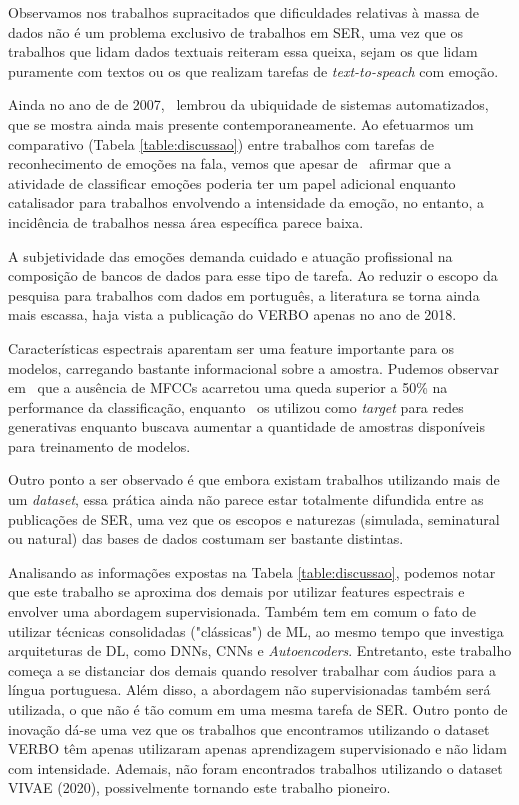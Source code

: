 Observamos nos trabalhos supracitados que dificuldades relativas à massa de dados não é um problema exclusivo de trabalhos em SER, uma vez que os trabalhos que lidam dados textuais reiteram essa queixa, sejam os que lidam puramente com textos ou os que realizam tarefas de \textit{text-to-speach} com emoção.

Ainda no ano de de 2007,~\cite{32.32} lembrou da ubiquidade de sistemas automatizados, que se mostra ainda mais presente contemporaneamente. Ao efetuarmos um comparativo (Tabela \ref{table:discussao}) entre trabalhos com tarefas de reconhecimento de emoções na fala, vemos que apesar de~\cite{14} afirmar que a atividade de classificar emoções poderia ter um papel adicional enquanto catalisador para trabalhos envolvendo a intensidade da emoção, no entanto, a incidência de trabalhos nessa área específica parece baixa.

A subjetividade das emoções demanda cuidado e atuação profissional na composição de bancos de dados para esse tipo de tarefa. Ao reduzir o escopo da pesquisa para trabalhos com dados em português, a literatura se torna ainda mais escassa, haja vista a publicação do VERBO apenas no ano de 2018.

Características espectrais aparentam ser uma feature importante para os modelos, carregando bastante informacional sobre a amostra. Pudemos observar em~\cite{11} que a ausência de \acrshort{MFCC}s acarretou uma queda superior a 50\% na performance da classificação, enquanto~\cite{34} os utilizou como \textit{target} para redes generativas enquanto buscava aumentar a quantidade de amostras disponíveis para treinamento de modelos.

Outro ponto a ser observado é que embora existam trabalhos utilizando mais de um \textit{dataset}, essa prática ainda não parece estar totalmente difundida entre as publicações de \acrshort{SER}, uma vez que os escopos e naturezas (simulada, seminatural ou natural) das bases de dados costumam ser bastante distintas.

Analisando as informações expostas na Tabela \ref{table:discussao}, podemos notar que este trabalho se aproxima dos demais por utilizar features espectrais e envolver uma abordagem supervisionada. Também tem em comum o fato de utilizar técnicas consolidadas ("clássicas") de \acrshort{ML}, ao mesmo tempo que investiga arquiteturas de \acrshort{DL}, como DNNs, \acrshort{CNNs} e \textit{Autoencoders}. Entretanto, este trabalho começa a se distanciar dos demais quando resolver trabalhar com áudios para a língua portuguesa. Além disso, a abordagem não supervisionadas também será utilizada, o que não é tão comum em uma mesma tarefa de \acrshort{SER}. Outro ponto de inovação dá-se uma vez que os trabalhos que encontramos utilizando o dataset VERBO têm apenas utilizaram apenas aprendizagem supervisionado e não lidam com intensidade. Ademais, não foram encontrados trabalhos utilizando o dataset VIVAE (2020), possivelmente tornando este trabalho pioneiro.

